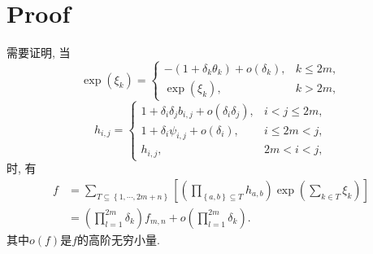 \documentclass{article}
\newcommand{\sbrace}[1]{\left(#1\right)}
\newcommand{\mbrace}[1]{\left[#1\right]}
\newcommand{\bbrace}[1]{\left\{#1\right\}}
\begin{document}
\section{Proof}
需要证明, 当
\begin{equation}
\exp\sbrace{\xi_k}=\left\{\begin{array}{ll}
-\sbrace{1+\delta_k \theta_k}+o\sbrace{\delta_k}, & k\le 2m, \\ 
\exp\sbrace{\xi_k}, & k>2m,   
\end{array}\right.
\end{equation}
\begin{equation}
h_{i,j}=\left\{\begin{array}{ll}
1+\delta_i \delta_j b_{i,j}+o\sbrace{\delta_i \delta_j}, & i<j\le 2m, \\
1+\delta_i \psi_{i,j}+o\sbrace{\delta_i}, & i\le 2m < j , \\
h_{i,j}, & 2m<i<j,
\end{array}\right.
\end{equation}
时, 有
\begin{equation}
\begin{aligned}
f&=\sum_{T\subseteq \bbrace{1,\cdots,2m+n}}{\mbrace{
  \sbrace{\prod_{\bbrace{a,b}\subseteq T}{h_{a,b}}}
  \exp\sbrace{\sum_{k\in T}{\xi_k}} 
}} \\ 
&=\sbrace{\prod_{l=1}^{2m}{\delta_k}}f_{m,n}+o\sbrace{\prod_{l=1}^{2m}{\delta_k}}.
\end{aligned}
\end{equation}
其中$o(f)$是$f$的高阶无穷小量.
\end{document}
